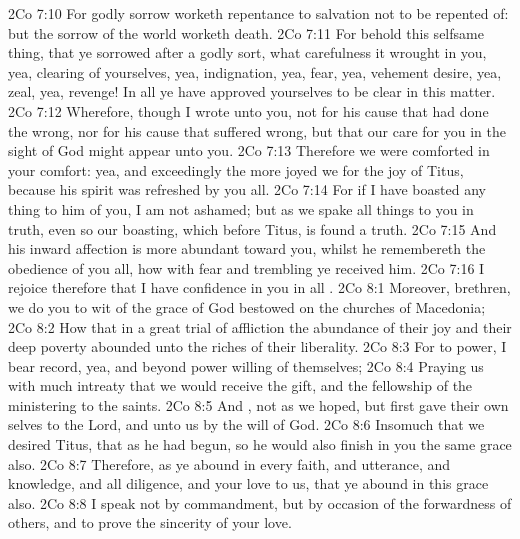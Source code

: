 \vs 2Co 7:10 For godly sorrow worketh repentance to salvation not to be repented of: but the sorrow of the world worketh death.
\vs 2Co 7:11 For behold this selfsame thing, that ye sorrowed after a godly sort, what carefulness it wrought in you, yea,  clearing of yourselves, yea,  indignation, yea,  fear, yea,  vehement desire, yea,  zeal, yea,  revenge! In all  ye have approved yourselves to be clear in this matter.
\vs 2Co 7:12 Wherefore, though I wrote unto you,  not for his cause that had done the wrong, nor for his cause that suffered wrong, but that our care for you in the sight of God might appear unto you.
\vs 2Co 7:13 Therefore we were comforted in your comfort: yea, and exceedingly the more joyed we for the joy of Titus, because his spirit was refreshed by you all.
\vs 2Co 7:14 For if I have boasted any thing to him of you, I am not ashamed; but as we spake all things to you in truth, even so our boasting, which  before Titus, is found a truth.
\vs 2Co 7:15 And his inward affection is more abundant toward you, whilst he remembereth the obedience of you all, how with fear and trembling ye received him.
\vs 2Co 7:16 I rejoice therefore that I have confidence in you in all .
\vs 2Co 8:1 Moreover, brethren, we do you to wit of the grace of God bestowed on the churches of Macedonia;
\vs 2Co 8:2 How that in a great trial of affliction the abundance of their joy and their deep poverty abounded unto the riches of their liberality.
\vs 2Co 8:3 For to  power, I bear record, yea, and beyond  power  willing of themselves;
\vs 2Co 8:4 Praying us with much intreaty that we would receive the gift, and  the fellowship of the ministering to the saints.
\vs 2Co 8:5 And , not as we hoped, but first gave their own selves to the Lord, and unto us by the will of God.
\vs 2Co 8:6 Insomuch that we desired Titus, that as he had begun, so he would also finish in you the same grace also.
\vs 2Co 8:7 Therefore, as ye abound in every  faith, and utterance, and knowledge, and  all diligence, and  your love to us,  that ye abound in this grace also.
\vs 2Co 8:8 I speak not by commandment, but by occasion of the forwardness of others, and to prove the sincerity of your love.
